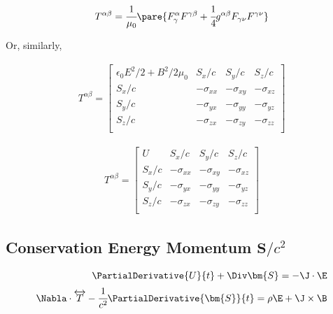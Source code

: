   \begin{align}
    T^{\alpha\beta} = \cfrac{1}{\mu_0} \pare{F^\alpha_\gamma F^{\gamma\beta}  + \cfrac{1}{4}g^{\alpha\beta}F_{\gamma\nu}F^{\gamma\nu}}
  \end{align}

  Or, similarly,

  \begin{align}
    T^{\alpha\beta} = \begin{bmatrix}
      \epsilon_0E^2/2 + B^2/2\mu_0 & S_x/c & S_y/c & S_z/c \\
      S_x/c & -\sigma_{xx} & -\sigma_{xy} & -\sigma_{xz} \\
      S_y/c & -\sigma_{yx} & -\sigma_{yy} & -\sigma_{yz} \\
      S_z/c & -\sigma_{zx} & -\sigma_{zy} & -\sigma_{zz} \\
  \end{bmatrix}
  \end{align}

  \begin{align}
    T^{\alpha\beta} = \begin{bmatrix}
      U & S_x/c & S_y/c & S_z/c \\
      S_x/c & -\sigma_{xx} & -\sigma_{xy} & -\sigma_{xz} \\
      S_y/c & -\sigma_{yx} & -\sigma_{yy} & -\sigma_{yz} \\
      S_z/c & -\sigma_{zx} & -\sigma_{zy} & -\sigma_{zz} \\
  \end{bmatrix}
  \end{align}

\subsection{Conservation Energy Momentum $\textbf{S}/c^2$}


  \begin{align}
    \label{eq:du_plus_divs}
    \PartialDerivative{U}{t} + \Div \bm{S} = - \J\cdot \E \\
    \label{eq:dt_minus_dsdt}
    \Nabla \cdot \overleftrightarrow{T} - \cfrac{1}{c^2}\PartialDerivative{\bm{S}}{t} = \rho\E + \J \times \B
  \end{align}

